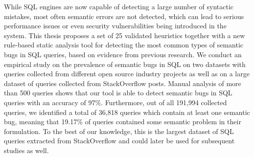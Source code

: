While SQL engines are now capable of detecting a large number of syntactic mistakes, most often semantic errors are not detected, which can lead to serious performance issues or even security vulnerabilities being introduced in the system. This thesis proposes a set of 25 validated heuristics together with a new rule-based static analysis tool for detecting the most common types of semantic bugs in SQL queries, based on evidence from previous research. We conduct an empirical study on the prevalence of semantic bugs in SQL on two datasets with queries collected from different open source industry projects as well as on a large dataset of queries collected from StackOverflow posts. Manual analysis of more than 500 queries shows that our tool is able to detect semantic bugs in SQL queries with an accuracy of 97\%. Furthermore, out of all 191,994 collected queries, we identified a total of 36,818 queries which contain at least one semantic bug, meaning that 19.17\% of queries contained some semantic problem in their formulation. To the best of our knowledge, this is the largest dataset of SQL queries extracted from StackOverflow and could later be used for subsequent studies as well.
